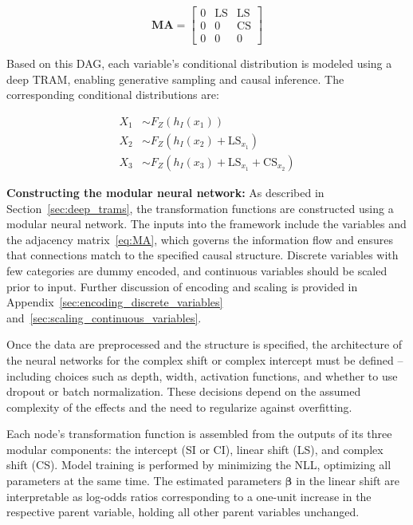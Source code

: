 \begin{equation}
\mathbf{MA} =
\begin{bmatrix}
  0 & \text{LS} & \text{LS} \\
  0 & 0  & \text{CS} \\
  0 & 0  & 0
\end{bmatrix}
\label{eq:MA}
\end{equation}

Based on this DAG, each variable's conditional distribution is modeled using a deep TRAM, enabling generative sampling and causal inference. The corresponding conditional distributions are:

\[
\begin{aligned}
X_1 &\sim F_Z(h_I(x_1)) \\
X_2 &\sim F_Z(h_I(x_2) + \mathrm{LS}_{x_1}) \\
X_3 &\sim F_Z(h_I(x_3) + \mathrm{LS}_{x_1} + \mathrm{CS}_{x_2})
\end{aligned}
\]


\textbf{Constructing the modular neural network:} As described in Section~\ref{sec:deep_trams}, the transformation functions are constructed using a modular neural network. The inputs into the framework include the variables and the adjacency matrix~\ref{eq:MA}, which governs the information flow and ensures that connections match to the specified causal structure. Discrete variables with few categories are dummy encoded, and continuous variables should be scaled prior to input. Further discussion of encoding and scaling is provided in Appendix~\ref{sec:encoding_discrete_variables} and~\ref{sec:scaling_continuous_variables}.

Once the data are preprocessed and the structure is specified, the architecture of the neural networks for the complex shift or complex intercept must be defined -- including choices such as depth, width, activation functions, and whether to use dropout or batch normalization. These decisions depend on the assumed complexity of the effects and the need to regularize against overfitting.

Each node's transformation function is assembled from the outputs of its three modular components: the intercept (SI or CI), linear shift (LS), and complex shift (CS). Model training is performed by minimizing the NLL, optimizing all parameters at the same time. The estimated parameters $\boldsymbol{\beta}$ in the linear shift are interpretable as log-odds ratios corresponding to a one-unit increase in the respective parent variable, holding all other parent variables unchanged.





